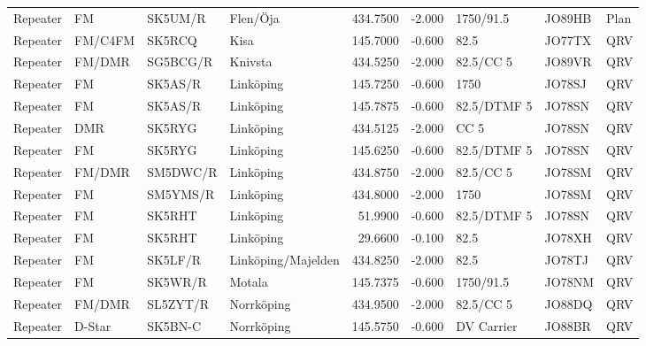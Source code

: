 \begin{landscape}
\begin{longtable}{llllrrlll}
	Repeater          & FM         & SK5UM/R  & Flen/Öja             &     434.7500 &     -2.000 & 1750/91.5         & JO89HB      & Plan     \\
	Repeater          & FM/C4FM    & SK5RCQ   & Kisa                 &     145.7000 &     -0.600 & 82.5              & JO77TX      & QRV      \\
	Repeater          & FM/DMR     & SG5BCG/R & Knivsta              &     434.5250 &     -2.000 & 82.5/CC 5         & JO89VR      & QRV      \\
	Repeater          & FM         & SK5AS/R  & Linköping            &     145.7250 &     -0.600 & 1750              & JO78SJ      & QRV      \\
	Repeater          & FM         & SK5AS/R  & Linköping            &     145.7875 &     -0.600 & 82.5/DTMF 5       & JO78SN      & QRV      \\
	Repeater          & DMR        & SK5RYG   & Linköping            &     434.5125 &     -2.000 & CC 5              & JO78SN      & QRV      \\
	Repeater          & FM         & SK5RYG   & Linköping            &     145.6250 &     -0.600 & 82.5/DTMF 5       & JO78SN      & QRV      \\
	Repeater          & FM/DMR     & SM5DWC/R & Linköping            &     434.8750 &     -2.000 & 82.5/CC 5         & JO78SM      & QRV      \\
	Repeater          & FM         & SM5YMS/R & Linköping            &     434.8000 &     -2.000 & 1750              & JO78SM      & QRV      \\
	Repeater          & FM         & SK5RHT   & Linköping            &      51.9900 &     -0.600 & 82.5/DTMF 5       & JO78SN      & QRV      \\
	Repeater          & FM         & SK5RHT   & Linköping            &      29.6600 &     -0.100 & 82.5              & JO78XH      & QRV      \\
	Repeater          & FM         & SK5LF/R  & Linköping/Majelden   &     434.8250 &     -2.000 & 82.5              & JO78TJ      & QRV      \\
	Repeater          & FM         & SK5WR/R  & Motala               &     145.7375 &     -0.600 & 1750/91.5         & JO78NM      & QRV      \\
	Repeater          & FM/DMR     & SL5ZYT/R & Norrköping           &     434.9500 &     -2.000 & 82.5/CC 5         & JO88DQ      & QRV      \\
	Repeater          & D-Star     & SK5BN-C  & Norrköping           &     145.5750 &     -0.600 & DV Carrier        & JO88BR      & QRV      \\

\end{longtable}
\end{landscape}
